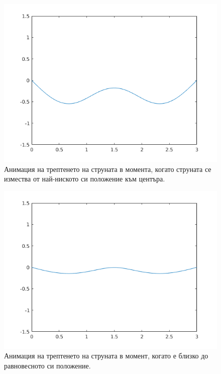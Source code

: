 \documentclass[14pt]{extarticle}
\begin{document}
\begin{figure}[H]
	\captionsetup{justification=centering,margin=2cm}
	\centering
	\includegraphics[scale=0.8]{images/task21downMid}
	\caption{Анимация на трептенето на струната в момента, когато струната се измества от най-ниското си положение към центъра.}
\end{figure}

\begin{figure}[H]
	\captionsetup{justification=centering,margin=2cm}
	\centering
	\includegraphics[scale=0.8]{images/task21mid}
	\caption{Анимация на трептенето на струната в момент, когато е близко до равновесното си положение.}
\end{figure}
\end{document}
